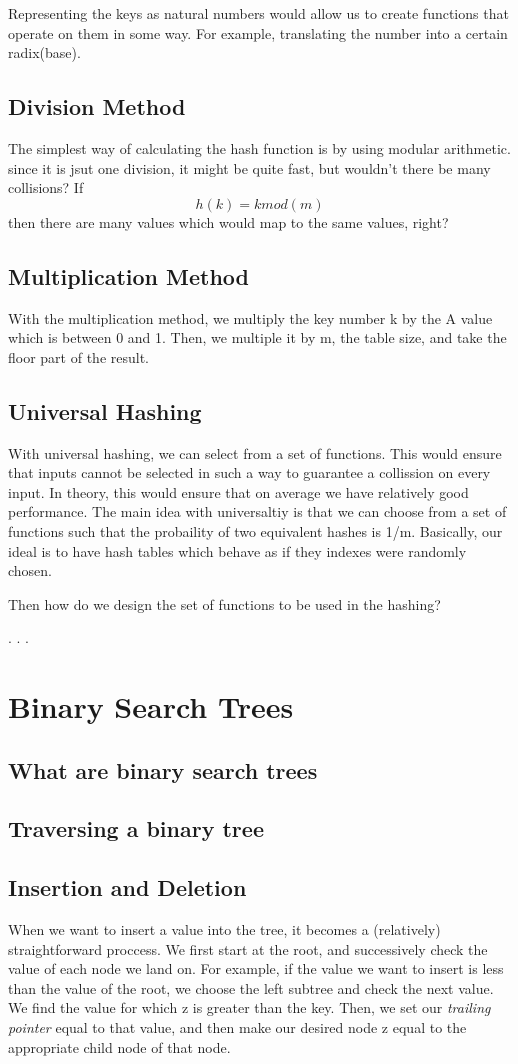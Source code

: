 \documentclass{article}
\begin{document}
Representing the keys as natural numbers would allow us to create functions that operate on them in some way.
For example, translating the number into a certain radix(base). 
\subsection{Division Method}
The simplest way of calculating the  hash function is by using modular arithmetic. since it is jsut one
division, it might be quite fast, but wouldn't there be many collisions? If
\begin{equation}
		h(k) = k mod(m)
\end{equation}
then there are many values which would map to the same values, right? 
\subsection{Multiplication Method}
With the multiplication method, we multiply the key number k by the A value which is between 0 and 1. 
Then, we multiple it by m, the table size, and take the floor part of the result.
\subsection{Universal Hashing}
With universal hashing, we can select from a set of functions. This would ensure that inputs cannot be 
selected in such a way to guarantee a collission on every input. In theory, this would ensure that 
on average we have relatively good performance. The main idea with universaltiy is that we can
choose from a set of functions such that the probaility of two equivalent hashes is 1/m. Basically,
our ideal is to have hash tables which behave as if they indexes were randomly chosen.

Then how do we design the set of functions to be used in the hashing? 

.
.
.
\section{Binary Search Trees}
\subsection{What are binary search trees}
\subsection{Traversing a binary tree}
\subsection{Insertion and Deletion}
When we want to insert a value into the tree, it becomes a (relatively) straightforward proccess. We first
start at the root, and successively check the value of each node we land on. For example, if the value
we want to insert is less than the value of the root, we choose the left subtree and check the 
next value. We find the value for which z is greater than the key. Then, we set our \textit{trailing pointer}
equal to that value, and then make our desired node z equal to the appropriate child node of that node. 
\end{document}
